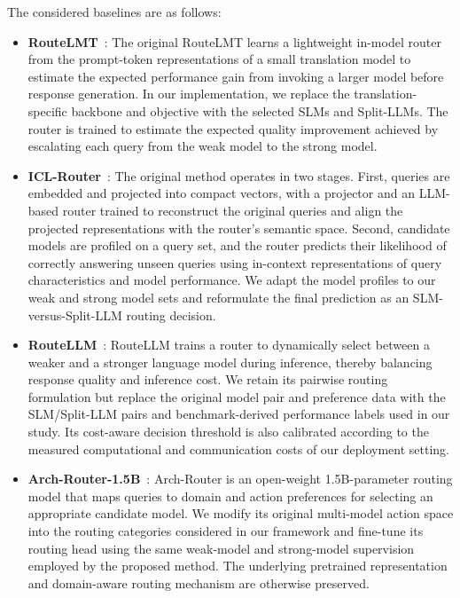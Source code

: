 \documentclass[lettersize,journal]{IEEEtran}
\begin{document}
The considered baselines are as follows:

\begin{itemize}
    \item \textbf{RouteLMT}~\cite{Luo2026}: The original RouteLMT learns a lightweight in-model router from the prompt-token representations of a small translation model to estimate the expected performance gain from invoking a larger model before response generation. In our implementation, we replace the translation-specific backbone and objective with the selected SLMs and Split-LLMs. The router is trained to estimate the expected quality improvement achieved by escalating each query from the weak model to the strong model.

    \item \textbf{ICL-Router}~\cite{Wang2026}: The original method operates in two stages. First, queries are embedded and projected into compact vectors, with a projector and an LLM-based router trained to reconstruct the original queries and align the projected representations with the router's semantic space. Second, candidate models are profiled on a query set, and the router predicts their likelihood of correctly answering unseen queries using in-context representations of query characteristics and model performance. We adapt the model profiles to our weak and strong model sets and reformulate the final prediction as an SLM-versus-Split-LLM routing decision.

    \item \textbf{RouteLLM}~\cite{Ong2025}: RouteLLM trains a router to dynamically select between a weaker and a stronger language model during inference, thereby balancing response quality and inference cost. We retain its pairwise routing formulation but replace the original model pair and preference data with the SLM/Split-LLM pairs and benchmark-derived performance labels used in our study. Its cost-aware decision threshold is also calibrated according to the measured computational and communication costs of our deployment setting.

    \item \textbf{Arch-Router-1.5B}~\cite{Tran2025}: Arch-Router is an open-weight 1.5B-parameter routing model that maps queries to domain and action preferences for selecting an appropriate candidate model. We modify its original multi-model action space into the routing categories considered in our framework and fine-tune its routing head using the same weak-model and strong-model supervision employed by the proposed method. The underlying pretrained representation and domain-aware routing mechanism are otherwise preserved.
\end{itemize}
\end{document}
